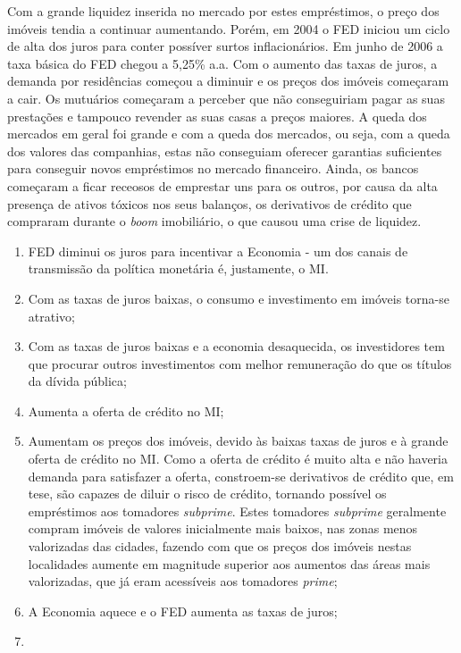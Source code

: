 \documentclass[
	12pt,				%
	oneside,			%
	a4paper,			%
	chapter=TITLE,		%
	section=TITLE,		%
	english,			%
	brazil				%
	]{abntex2}
\begin{document}
\begin{refsection}
Com a grande liquidez inserida no mercado por estes empréstimos, o preço dos
imóveis tendia a continuar aumentando. Porém, em 2004 o \gls{FED} iniciou um
ciclo de alta dos juros para conter possíver surtos inflacionários. Em junho de
2006 a taxa básica do \gls{FED} chegou a 5,25\% a.a. Com o aumento das taxas de
juros, a demanda por residências começou a diminuir e os preços dos imóveis
começaram a cair. Os mutuários começaram a perceber que não conseguiriam
pagar as suas prestações e tampouco revender as suas casas a preços maiores. A
queda dos mercados em geral foi grande e com a queda dos mercados, ou seja, com
a queda dos valores das companhias, estas não conseguiam oferecer garantias
suficientes para conseguir novos empréstimos no mercado financeiro. Ainda, os
bancos começaram a ficar receosos de emprestar uns para os outros, por causa
da alta presença de ativos tóxicos nos seus balanços, os derivativos de crédito
que compraram durante o \emph{boom} imobiliário, o que causou uma crise de liquidez.
\begin{enumerate}
\def\labelenumi{\arabic{enumi}.}
\item
  FED diminui os juros para incentivar a Economia - um dos canais de
  transmissão da política monetária é, justamente, o \gls{MI}.
\item
  Com as taxas de juros baixas, o consumo e investimento em imóveis torna-se
  atrativo;
\item
  Com as taxas de juros baixas e a economia desaquecida, os investidores tem
  que procurar outros investimentos com melhor remuneração do que os títulos da
  dívida pública;
\item
  Aumenta a oferta de crédito no \gls{MI};
\item
  Aumentam os preços dos imóveis, devido às baixas taxas de juros e à grande
  oferta de crédito no \gls{MI}. Como a oferta de crédito é muito alta e não
  haveria demanda para satisfazer a oferta, constroem-se derivativos de crédito
  que, em tese, são capazes de diluir o risco de crédito, tornando possível os
  empréstimos aos tomadores \emph{subprime}. Estes tomadores \emph{subprime} geralmente
  compram imóveis de valores inicialmente mais baixos, nas zonas menos valorizadas
  das cidades, fazendo com que os preços dos imóveis nestas localidades aumente
  em magnitude superior aos aumentos das áreas mais valorizadas, que já eram
  acessíveis aos tomadores \emph{prime};
\item
  A Economia aquece e o FED aumenta as taxas de juros;
\item

\end{enumerate}
\end{refsection}
\end{document}
